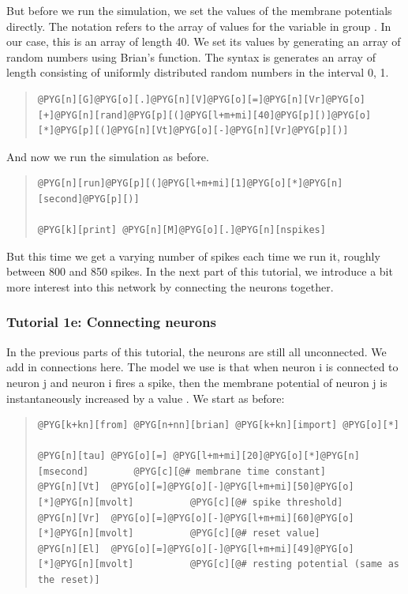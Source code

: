 \documentclass[letterpaper,10pt,english]{manual}
\begin{document}
But before we run the simulation, we set the values of the
membrane potentials directly. The notation  refers
to the array of values for the variable  in group . In
our case, this is an array of length 40. We set its values
by generating an array of random numbers using Brian's
 function. The syntax is  generates an
array of length  consisting of uniformly distributed
random numbers in the interval 0, 1.
\begin{quote}

\begin{Verbatim}[commandchars=@\[\]]
@PYG[n][G]@PYG[o][.]@PYG[n][V]@PYG[o][=]@PYG[n][Vr]@PYG[o][+]@PYG[n][rand]@PYG[p][(]@PYG[l+m+mi][40]@PYG[p][)]@PYG[o][*]@PYG[p][(]@PYG[n][Vt]@PYG[o][-]@PYG[n][Vr]@PYG[p][)]
\end{Verbatim}
\end{quote}

And now we run the simulation as before.
\begin{quote}

\begin{Verbatim}[commandchars=@\[\]]
@PYG[n][run]@PYG[p][(]@PYG[l+m+mi][1]@PYG[o][*]@PYG[n][second]@PYG[p][)]

@PYG[k][print] @PYG[n][M]@PYG[o][.]@PYG[n][nspikes]
\end{Verbatim}
\end{quote}

But this time we get a varying number of spikes each time
we run it, roughly between 800 and 850 spikes. In the
next part of this tutorial, we introduce a bit more
interest into this network by connecting the neurons together.

\resetcurrentobjects
\hypertarget{--doc-tutorial_1e_connecting_neurons}{}

\subsubsection{Tutorial 1e: Connecting neurons}

In the previous parts of this tutorial, the neurons are
still all unconnected. We add in connections here. The
model we use is that when neuron i is connected to
neuron j and neuron i fires a spike, then the membrane
potential of neuron j is instantaneously increased by
a value . We start as before:
\begin{quote}

\begin{Verbatim}[commandchars=@\[\]]
@PYG[k+kn][from] @PYG[n+nn][brian] @PYG[k+kn][import] @PYG[o][*]

@PYG[n][tau] @PYG[o][=] @PYG[l+m+mi][20]@PYG[o][*]@PYG[n][msecond]        @PYG[c][@# membrane time constant]
@PYG[n][Vt]  @PYG[o][=]@PYG[o][-]@PYG[l+m+mi][50]@PYG[o][*]@PYG[n][mvolt]          @PYG[c][@# spike threshold]
@PYG[n][Vr]  @PYG[o][=]@PYG[o][-]@PYG[l+m+mi][60]@PYG[o][*]@PYG[n][mvolt]          @PYG[c][@# reset value]
@PYG[n][El]  @PYG[o][=]@PYG[o][-]@PYG[l+m+mi][49]@PYG[o][*]@PYG[n][mvolt]          @PYG[c][@# resting potential (same as the reset)]
\end{Verbatim}
\end{quote}
\end{document}
